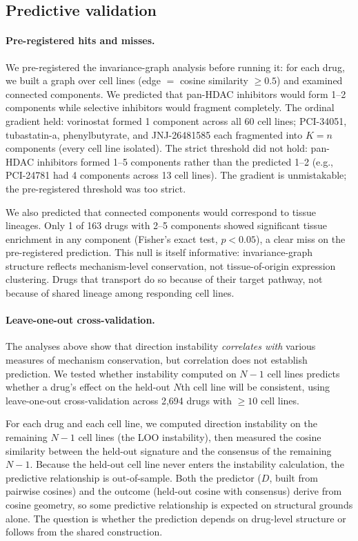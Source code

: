 \documentclass[11pt]{article}
\begin{document}
\subsection{Predictive validation}

\paragraph{Pre-registered hits and misses.}

We pre-registered the invariance-graph analysis before running it: for
each drug, we built a graph over cell lines (edge $=$ cosine similarity
$\geq 0.5$) and examined connected components. We predicted that
pan-HDAC inhibitors would form 1--2 components while selective
inhibitors would fragment completely. The ordinal gradient held:
vorinostat formed 1 component across all 60 cell lines; PCI-34051,
tubastatin-a, phenylbutyrate, and JNJ-26481585 each fragmented into
$K = n$ components (every cell line isolated). The strict threshold
did not hold: pan-HDAC inhibitors formed 1--5 components rather
than the predicted 1--2 (e.g., PCI-24781 had 4 components across
13 cell lines). The gradient is unmistakable; the pre-registered
threshold was too strict.

We also predicted that connected components would correspond to
tissue lineages. Only 1 of 163 drugs with 2--5 components showed
significant tissue enrichment in any component (Fisher's exact test,
$p < 0.05$), a clear miss on the pre-registered prediction.
This null is itself informative: invariance-graph structure reflects
mechanism-level conservation, not tissue-of-origin expression
clustering. Drugs that transport do so because of their target
pathway, not because of shared lineage among responding cell lines.

\paragraph{Leave-one-out cross-validation.}
\label{sec:holdout}

The analyses above show that direction instability \emph{correlates
with} various measures of mechanism conservation, but correlation does
not establish prediction. We tested whether instability computed on
$N{-}1$ cell lines predicts whether a drug's effect on the held-out
$N$th cell line will be consistent, using leave-one-out cross-validation
across 2{,}694 drugs with $\geq 10$ cell lines.

For each drug and each cell line, we computed direction instability on
the remaining $N{-}1$ cell lines (the LOO instability), then measured
the cosine similarity between the held-out signature and the consensus
of the remaining $N{-}1$. Because the held-out cell line never enters
the instability calculation, the predictive relationship is
out-of-sample. Both the predictor ($D$, built from pairwise cosines)
and the outcome (held-out cosine with consensus) derive from cosine
geometry, so some predictive relationship is expected on structural
grounds alone. The question is whether the prediction depends on
drug-level structure or follows from the shared construction.
\end{document}
